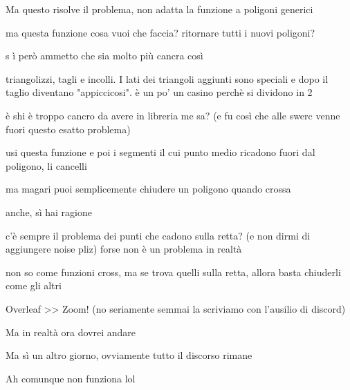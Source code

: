 Ma questo risolve il problema, non adatta la funzione a poligoni generici

ma questa funzione cosa vuoi che faccia? ritornare tutti i nuovi poligoni?

s ì
però ammetto che sia molto più cancra così




triangolizzi, tagli e incolli. I lati dei triangoli aggiunti sono speciali e dopo il taglio diventano "appiccicosi". è un po' un casino perchè si dividono in 2

è shi è troppo cancro da avere in libreria me sa? (e fu così che alle swerc venne fuori questo esatto problema)

usi questa funzione e poi i segmenti il cui punto medio ricadono fuori dal poligono, li cancelli

ma magari puoi semplicemente chiudere un poligono quando crossa

anche, sì hai ragione

c'è sempre il problema dei punti che cadono sulla retta? (e non dirmi di aggiungere noise pliz) forse non è un problema in realtà

non so come funzioni cross, ma se trova quelli sulla retta, allora basta chiuderli come gli altri

Overleaf >> Zoom! (no seriamente semmai la scriviamo con l'ausilio di discord) 

Ma in realtà ora dovrei andare

Ma sì un altro giorno, ovviamente tutto il discorso rimane

Ah comunque non funziona lol
\fi